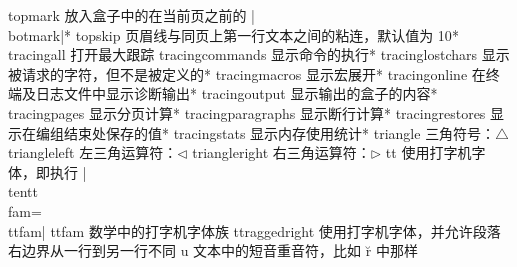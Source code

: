 \capcs topmark {放入盒子中的在当前页之前的 |\\botmark|}*{}
\capcs topskip {页眉线与同页上第一行文本之间的粘连，默认值为 10\pt}*{}
\capcs tracingall {打开最大跟踪}{}{}
\capcs tracingcommands {显示命令的执行}*{}
\capcs tracinglostchars {显示被请求的字符，但不是被定义的}*{}
\capcs tracingmacros {显示宏展开}*{}
\capcs tracingonline {在终端及日志文件中显示诊断输出}*{}
\capcs tracingoutput {显示输出的盒子的内容}*{}
\capcs tracingpages {显示分页计算}*{}
\capcs tracingparagraphs {显示断行计算}*{}
\capcs tracingrestores {显示在编组结束处保存的值}*{}
\capcs tracingstats {显示内存使用统计}*{}
\capcs triangle {三角符号：$\triangle$}{}{}
\capcs triangleleft {左三角运算符：$\triangleleft$}{}{}
\capcs triangleright {右三角运算符：$\triangleright$}{}{}
\capcs tt {使用打字机字体，即执行 |\\tentt\\fam=\\ttfam|}{}{}
\capcs ttfam {数学中的打字机字体族}{}{}
\capcs ttraggedright {使用打字机字体，并允许段落右边界从一行到另一行不同}{}{}
%
\capcs u {文本中的短音重音符，比如 \u r 中那样}{}{}
